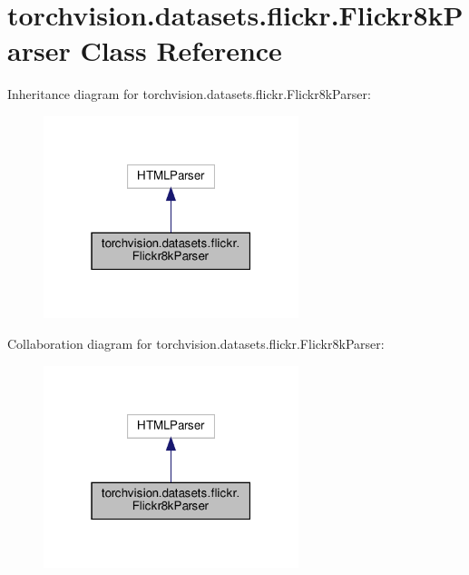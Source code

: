 \hypertarget{classtorchvision_1_1datasets_1_1flickr_1_1Flickr8kParser}{}\section{torchvision.\+datasets.\+flickr.\+Flickr8k\+Parser Class Reference}
\label{classtorchvision_1_1datasets_1_1flickr_1_1Flickr8kParser}


Inheritance diagram for torchvision.\+datasets.\+flickr.\+Flickr8k\+Parser\+:
\nopagebreak
\begin{figure}[H]
\begin{center}
\leavevmode
\includegraphics[width=211pt]{classtorchvision_1_1datasets_1_1flickr_1_1Flickr8kParser__inherit__graph}
\end{center}
\end{figure}


Collaboration diagram for torchvision.\+datasets.\+flickr.\+Flickr8k\+Parser\+:
\nopagebreak
\begin{figure}[H]
\begin{center}
\leavevmode
\includegraphics[width=211pt]{classtorchvision_1_1datasets_1_1flickr_1_1Flickr8kParser__coll__graph}
\end{center}
\end{figure}
